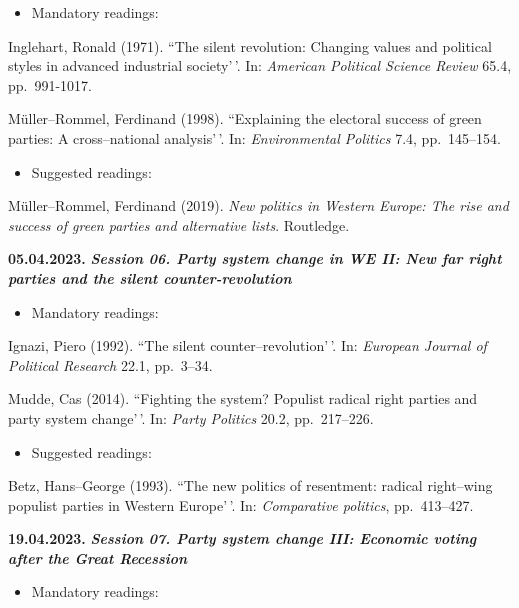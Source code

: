 \documentclass[
  12pt,
]{article}
\providecommand{\tightlist}{%
  \setlength{\itemsep}{0pt}\setlength{\parskip}{0pt}}
\begin{document}
\begin{itemize}
\tightlist
\item
  Mandatory readings:
\end{itemize}

Inglehart, Ronald (1971). ``The silent revolution: Changing values and
political styles in advanced industrial society'\,'. In:
\emph{American Political Science Review} 65.4, pp.~991-1017.

Müller--Rommel, Ferdinand (1998). ``Explaining the electoral success of
green parties: A cross--national analysis'\,'. In:
\emph{Environmental Politics} 7.4, pp.~145--154.

\begin{itemize}
\tightlist
\item
  Suggested readings:
\end{itemize}

Müller--Rommel, Ferdinand (2019).
\emph{New politics in Western Europe: The rise and success of green parties and alternative lists}.
Routledge.

\textbf{05.04.2023.} \textbf{\emph{Session 06. Party system change in WE
II: New far right parties and the silent counter-revolution}}

\begin{itemize}
\tightlist
\item
  Mandatory readings:
\end{itemize}

Ignazi, Piero (1992). ``The silent counter--revolution'\,'. In:
\emph{European Journal of Political Research} 22.1, pp.~3--34.

Mudde, Cas (2014). ``Fighting the system? Populist radical right parties
and party system change'\,'. In: \emph{Party Politics} 20.2,
pp.~217--226.

\begin{itemize}
\tightlist
\item
  Suggested readings:
\end{itemize}

Betz, Hans--George (1993). ``The new politics of resentment: radical
right--wing populist parties in Western Europe'\,'. In:
\emph{Comparative politics}, pp.~413--427.

\textbf{19.04.2023.} \textbf{\emph{Session 07. Party system change III:
Economic voting after the Great Recession}}

\begin{itemize}
\tightlist
\item
  Mandatory readings:
\end{itemize}
\end{document}

